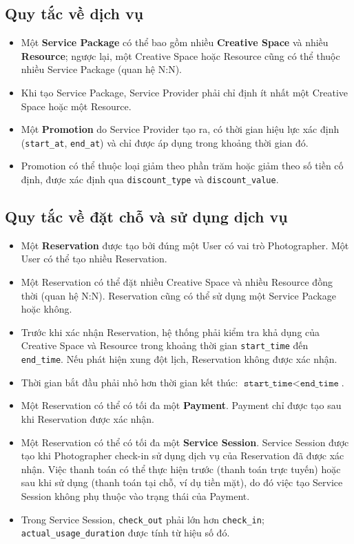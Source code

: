 \subsection{Quy tắc về dịch vụ}

\begin{itemize}
    \item Một \textbf{Service Package} có thể bao gồm nhiều \textbf{Creative Space} và nhiều \textbf{Resource}; ngược lại, một Creative Space hoặc Resource cũng có thể thuộc nhiều Service Package (quan hệ N:N).
    \item Khi tạo Service Package, Service Provider phải chỉ định ít nhất một Creative Space hoặc một Resource.
    \item Một \textbf{Promotion} do Service Provider tạo ra, có thời gian hiệu lực xác định (\texttt{start\_at}, \texttt{end\_at}) và chỉ được áp dụng trong khoảng thời gian đó.
    \item Promotion có thể thuộc loại giảm theo phần trăm hoặc giảm theo số tiền cố định, được xác định qua \texttt{discount\_type} và \texttt{discount\_value}.
\end{itemize}

\subsection{Quy tắc về đặt chỗ và sử dụng dịch vụ}

\begin{itemize}
    \item Một \textbf{Reservation} được tạo bởi đúng một User có vai trò Photographer. Một User có thể tạo nhiều Reservation.
    \item Một Reservation có thể đặt nhiều Creative Space và nhiều Resource đồng thời (quan hệ N:N). Reservation cũng có thể sử dụng một Service Package hoặc không.
    \item Trước khi xác nhận Reservation, hệ thống phải kiểm tra khả dụng của Creative Space và Resource trong khoảng thời gian \texttt{start\_time} đến \texttt{end\_time}. Nếu phát hiện xung đột lịch, Reservation không được xác nhận.
    \item Thời gian bắt đầu phải nhỏ hơn thời gian kết thúc: $\texttt{start\_time} < \texttt{end\_time}$.
    \item Một Reservation có thể có tối đa một \textbf{Payment}. Payment chỉ được tạo sau khi Reservation được xác nhận.
    \item Một Reservation có thể có tối đa một \textbf{Service Session}. Service Session được tạo khi Photographer check-in sử dụng dịch vụ của Reservation đã được xác nhận. Việc thanh toán có thể thực hiện trước (thanh toán trực tuyến) hoặc sau khi sử dụng (thanh toán tại chỗ, ví dụ tiền mặt), do đó việc tạo Service Session không phụ thuộc vào trạng thái của Payment.
    \item Trong Service Session, \texttt{check\_out} phải lớn hơn \texttt{check\_in}; \texttt{actual\_usage\_duration} được tính từ hiệu số đó.
\end{itemize}

